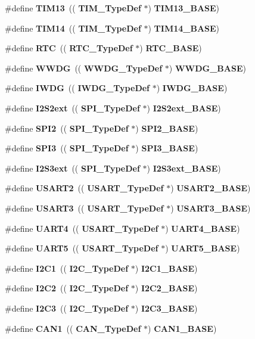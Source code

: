 \begin{DoxyCompactItemize}
\item 
\#define \textbf{ T\+I\+M13}~((\textbf{ T\+I\+M\+\_\+\+Type\+Def} $\ast$) \textbf{ T\+I\+M13\+\_\+\+B\+A\+SE})
\item 
\#define \textbf{ T\+I\+M14}~((\textbf{ T\+I\+M\+\_\+\+Type\+Def} $\ast$) \textbf{ T\+I\+M14\+\_\+\+B\+A\+SE})
\item 
\#define \textbf{ R\+TC}~((\textbf{ R\+T\+C\+\_\+\+Type\+Def} $\ast$) \textbf{ R\+T\+C\+\_\+\+B\+A\+SE})
\item 
\#define \textbf{ W\+W\+DG}~((\textbf{ W\+W\+D\+G\+\_\+\+Type\+Def} $\ast$) \textbf{ W\+W\+D\+G\+\_\+\+B\+A\+SE})
\item 
\#define \textbf{ I\+W\+DG}~((\textbf{ I\+W\+D\+G\+\_\+\+Type\+Def} $\ast$) \textbf{ I\+W\+D\+G\+\_\+\+B\+A\+SE})
\item 
\#define \textbf{ I2\+S2ext}~((\textbf{ S\+P\+I\+\_\+\+Type\+Def} $\ast$) \textbf{ I2\+S2ext\+\_\+\+B\+A\+SE})
\item 
\#define \textbf{ S\+P\+I2}~((\textbf{ S\+P\+I\+\_\+\+Type\+Def} $\ast$) \textbf{ S\+P\+I2\+\_\+\+B\+A\+SE})
\item 
\#define \textbf{ S\+P\+I3}~((\textbf{ S\+P\+I\+\_\+\+Type\+Def} $\ast$) \textbf{ S\+P\+I3\+\_\+\+B\+A\+SE})
\item 
\#define \textbf{ I2\+S3ext}~((\textbf{ S\+P\+I\+\_\+\+Type\+Def} $\ast$) \textbf{ I2\+S3ext\+\_\+\+B\+A\+SE})
\item 
\#define \textbf{ U\+S\+A\+R\+T2}~((\textbf{ U\+S\+A\+R\+T\+\_\+\+Type\+Def} $\ast$) \textbf{ U\+S\+A\+R\+T2\+\_\+\+B\+A\+SE})
\item 
\#define \textbf{ U\+S\+A\+R\+T3}~((\textbf{ U\+S\+A\+R\+T\+\_\+\+Type\+Def} $\ast$) \textbf{ U\+S\+A\+R\+T3\+\_\+\+B\+A\+SE})
\item 
\#define \textbf{ U\+A\+R\+T4}~((\textbf{ U\+S\+A\+R\+T\+\_\+\+Type\+Def} $\ast$) \textbf{ U\+A\+R\+T4\+\_\+\+B\+A\+SE})
\item 
\#define \textbf{ U\+A\+R\+T5}~((\textbf{ U\+S\+A\+R\+T\+\_\+\+Type\+Def} $\ast$) \textbf{ U\+A\+R\+T5\+\_\+\+B\+A\+SE})
\item 
\#define \textbf{ I2\+C1}~((\textbf{ I2\+C\+\_\+\+Type\+Def} $\ast$) \textbf{ I2\+C1\+\_\+\+B\+A\+SE})
\item 
\#define \textbf{ I2\+C2}~((\textbf{ I2\+C\+\_\+\+Type\+Def} $\ast$) \textbf{ I2\+C2\+\_\+\+B\+A\+SE})
\item 
\#define \textbf{ I2\+C3}~((\textbf{ I2\+C\+\_\+\+Type\+Def} $\ast$) \textbf{ I2\+C3\+\_\+\+B\+A\+SE})
\item 
\#define \textbf{ C\+A\+N1}~((\textbf{ C\+A\+N\+\_\+\+Type\+Def} $\ast$) \textbf{ C\+A\+N1\+\_\+\+B\+A\+SE})

\end{DoxyCompactItemize}
